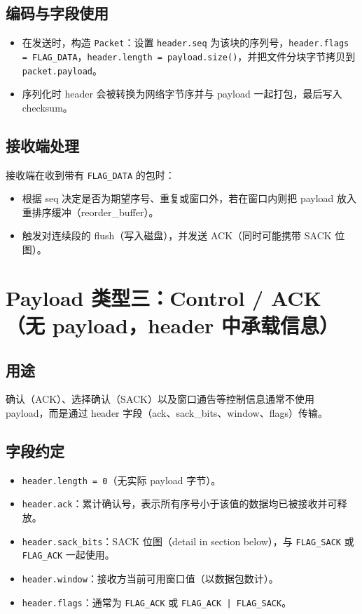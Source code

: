 \documentclass[11pt,a4paper]{article}
\begin{document}
\subsection{编码与字段使用}
\begin{itemize}
  \item 在发送时，构造 \texttt{Packet}：设置 \texttt{header.seq} 为该块的序列号，\texttt{header.flags = FLAG\_DATA}，\texttt{header.length = payload.size()}，并把文件分块字节拷贝到 \texttt{packet.payload}。
  \item 序列化时 header 会被转换为网络字节序并与 payload 一起打包，最后写入 checksum。
\end{itemize}

\subsection{接收端处理}
接收端在收到带有 \texttt{FLAG\_DATA} 的包时：
\begin{itemize}
  \item 根据 seq 决定是否为期望序号、重复或窗口外，若在窗口内则把 payload 放入重排序缓冲（reorder\_buffer）。
  \item 触发对连续段的 flush（写入磁盘），并发送 ACK（同时可能携带 SACK 位图）。
\end{itemize}

\section{Payload 类型三：Control / ACK（无 payload，header 中承载信息）}
\subsection{用途}
确认（ACK）、选择确认（SACK）以及窗口通告等控制信息通常不使用 payload，而是通过 header 字段（ack、sack\_bits、window、flags）传输。

\subsection{字段约定}
\begin{itemize}
  \item \texttt{header.length = 0}（无实际 payload 字节）。
  \item \texttt{header.ack}：累计确认号，表示所有序号小于该值的数据均已被接收并可释放。
  \item \texttt{header.sack\_bits}：SACK 位图（detail in section below），与 \texttt{FLAG\_SACK} 或 \texttt{FLAG\_ACK} 一起使用。
  \item \texttt{header.window}：接收方当前可用窗口值（以数据包数计）。
  \item \texttt{header.flags}：通常为 \texttt{FLAG\_ACK} 或 \texttt{FLAG\_ACK | FLAG\_SACK}。
\end{itemize}
\end{document}
